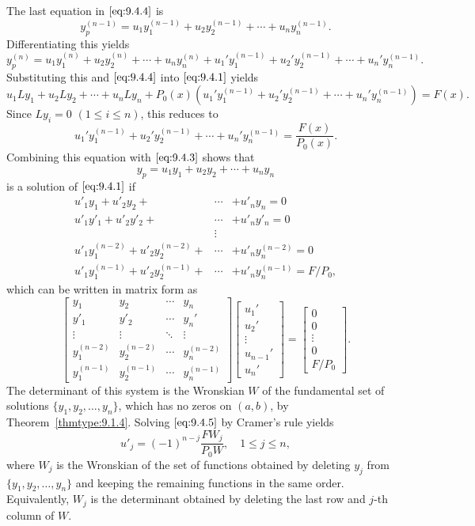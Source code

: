 \documentclass{ximera}
\begin{document}
The last equation in $\eqref{eq:9.4.4}$ is
$$
y_p^{(n-1)}=u_1y_1^{(n-1)}+u_2y_2^{(n-1)}+\cdots+u_ny_n^{(n-1)}.
$$
Differentiating this yields
$$
y_p^{(n)}=u_1y_1^{(n)}+u_2y_2^{(n)}+\cdots+u_ny_n^{(n)}+
u_1'y_1^{(n-1)}+u_2'y_2^{(n-1)}+\cdots+u_n'y_n^{(n-1)}.
$$
Substituting this and  $\eqref{eq:9.4.4}$ into $\eqref{eq:9.4.1}$
yields
$$
u_1Ly_1+u_2Ly_2+\cdots+u_nLy_n+P_0(x)\left(
u_1'y_1^{(n-1)}+u_2'y_2^{(n-1)}+\cdots+u_n'y_n^{(n-1)}\right)=F(x).
$$
Since  $Ly_i=0$ $(1 \leq i \leq n)$, this reduces to
$$
u_1'y_1^{(n-1)}+u_2'y_2^{(n-1)}+\cdots+u_n'y_n^{(n-1)}=\frac{F(x)}{P_0(x)}.
$$
Combining this equation with $\eqref{eq:9.4.3}$ shows that
$$
y_p=u_1y_1+u_2y_2+\cdots+u_ny_n
$$
is a solution of $\eqref{eq:9.4.1}$ if
$$
\begin{array}{rcl}
u'_1y_1+u'_2y_2+&\cdots&+u'_ny_n=0 \\
u'_1y'_1+u'_2y'_2+&\cdots&+u'_ny'_n=0 \\
&\vdots& \\
u'_1y_1^{(n-2)}+u'_2y^{(n-2)}_2+&\cdots&+u'_ny^{(n-2)}_n
=0 \\
u'_1y^{(n-1)}_1+u'_2y^{(n-1)}_2+&\cdots&+u'_n
y^{(n-1)}_n=F/P_0,
\end{array}
$$
which can be written in matrix form as
\begin{equation} \label{eq:9.4.5}
\begin{bmatrix}
y_1&y_2&\cdots&y_n \\
y'_1&y'_2&\cdots&y_n'\\
\vdots&\vdots&\ddots&\vdots\\
y_1^{(n-2)}&y_2^{(n-2)}&\cdots&y_n^{(n-2)}\\
y_1^{(n-1)}&y_2^{(n-1)}&\cdots&y_n^{(n-1)}
\end{bmatrix}
\begin{bmatrix}u_1'\\u_2'\\\vdots\\u_{n-1}'\\u_n'\end{bmatrix}=
\begin{bmatrix}0\\0\\ \vdots\\0\\F/ P_0\end{bmatrix}.
\end{equation}
The determinant of this system  is the Wronskian $W$ of
the fundamental set of solutions  $\{y_1,y_2,\dots,y_n\}$,
which has no zeros on $(a,b)$, by Theorem~\ref{thmtype:9.1.4}.
Solving
$\eqref{eq:9.4.5}$ by Cramer's rule yields
\begin{equation} \label{eq:9.4.6}
u'_j=(-1)^{n-j}\frac{FW_j}{P_0W},\quad 1\leq j\leq n,
\end{equation}
 where $W_j$ is the Wronskian of the set of
functions obtained by deleting $y_j$ from  $\{y_1,y_2,\dots,y_n\}$
 and keeping the remaining functions in the
same order. Equivalently, $W_j$ is the determinant obtained by
deleting the last row and $j$-th column of $W$.
\end{document}
